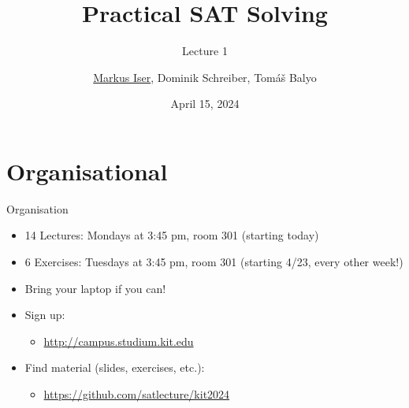 \documentclass[t]{sdqbeamer}
\title[SAT Solving]{Practical SAT Solving}
\subtitle{Lecture 1}
\author{\underline{Markus Iser}, Dominik Schreiber, Tom\'a\v{s} Balyo}
\date{April 15, 2024}
\begin{document}
\begin{frame}
	\thispagestyle{empty}
	\titlepage
\end{frame}

\section{Organisational}
\begin{frame}{Organisation}
	\begin{itemize}\setlength{\itemsep}{1em}
		\item 14 Lectures: Mondays at 3:45 pm, room 301 (starting today)
		\item 6 Exercises: Tuesdays at 3:45 pm, room 301 (starting 4/23, every other week!)
		\item Bring your laptop if you can!
		\item Sign up:
		\begin{itemize}
			\item \url{http://campus.studium.kit.edu}
		\end{itemize}
		\item Find material (slides, exercises, etc.):
		\begin{itemize}
			\item \url{https://github.com/satlecture/kit2024}
		\end{itemize}
	\end{itemize}
\end{frame}
\end{document}

